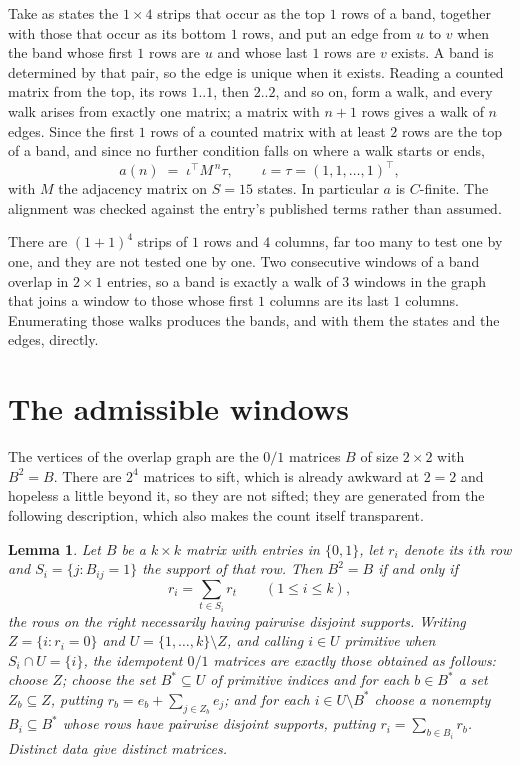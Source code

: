 \documentclass[11pt,a4paper]{article}
\theoremstyle{plain}
\newtheorem{lemma}[theorem]{Lemma}
\theoremstyle{definition}
\begin{document}
Take as states the $1\times4$ strips that occur as the top $1$ rows of a band,
together with those that occur as its bottom $1$ rows, and put an edge from $u$ to $v$
when the band whose first $1$ rows are $u$ and whose last $1$ rows are $v$ exists.
A band is determined by that pair, so the edge is unique when it exists. Reading a counted
matrix from the top, its rows $1..1$, then $2..2$, and so on, form a walk, and every
walk arises from exactly one matrix; a matrix with $n+1$ rows gives a walk of $n$ edges.
Since the first $1$ rows of a counted matrix with at least $2$ rows are the top of a
band, and since no further condition falls on where a walk starts or ends,
\[
a(n)\;=\;\iota^{\!\top}M^{\,n}\tau ,\qquad \iota=\tau=(1,1,\dots,1)^{\!\top},
\]
with $M$ the adjacency matrix on $S=15$ states. In particular $a$ is $C$-finite. The
alignment was checked against the entry's published terms rather than assumed.

There are $(1 + 1)^{4}$ strips of $1$ rows and $4$ columns, far too
many to test one by one, and they are not tested one by one. Two consecutive windows of a band
overlap in $2\times1$ entries, so a band is exactly a walk of $3$ windows in
the graph that joins a window to those whose first $1$ columns are its last $1$
columns. Enumerating those walks produces the bands, and with them the states and the edges,
directly.

\section{The admissible windows}

The vertices of the overlap graph are the $0/1$ matrices $B$ of size $2\times2$ with
$B^2=B$. There are $2^{4}$ matrices to sift, which is already awkward at $2=2$ and
hopeless a little beyond it, so they are not sifted; they are generated from the following
description, which also makes the count itself transparent.

\begin{lemma}\label{lem:idem}
Let $B$ be a $k\times k$ matrix with entries in $\{0,1\}$, let $r_i$ denote its $i$th row and
$S_i=\{j:B_{ij}=1\}$ the support of that row. Then $B^2=B$ if and only if
\[
r_i=\sum_{t\in S_i}r_t \qquad (1\le i\le k),
\]
the rows on the right necessarily having pairwise disjoint supports. Writing
$Z=\{i:r_i=0\}$ and $U=\{1,\dots,k\}\setminus Z$, and calling $i\in U$ \emph{primitive}
when $S_i\cap U=\{i\}$, the idempotent $0/1$ matrices are exactly those obtained as follows:
choose $Z$; choose the set $B^{\ast}\subseteq U$ of primitive indices and for each
$b\in B^{\ast}$ a set $Z_b\subseteq Z$, putting $r_b=e_b+\sum_{j\in Z_b}e_j$; and for each
$i\in U\setminus B^{\ast}$ choose a nonempty $B_i\subseteq B^{\ast}$ whose rows have
pairwise disjoint supports, putting $r_i=\sum_{b\in B_i}r_b$. Distinct data give distinct
matrices.
\end{lemma}
\end{document}
